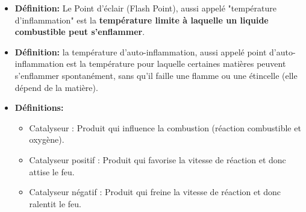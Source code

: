 \documentclass[a4paper]{article}
\begin{document}
\begin{itemize}
\item \textbf{Définition:} Le Point d’éclair (Flash Point), aussi appelé "température d’inflammation" est la \textbf{température limite à laquelle un liquide combustible peut s’enflammer}.





\item \textbf{Définition:} la température d’auto-inflammation, aussi appelé point d'auto-inflammation est la température pour laquelle certaines matières peuvent s’enflammer spontanément, sans qu’il faille une flamme ou une étincelle (elle dépend de la matière).





\item \textbf{Définitions:}
\begin{itemize}
    \item Catalyseur : Produit qui influence la combustion (réaction combustible et oxygène).
    \item Catalyseur positif : Produit qui favorise la vitesse de réaction et donc attise le feu.
    \item Catalyseur négatif : Produit qui freine la vitesse de réaction et donc ralentit le feu.
\end{itemize}






\end{itemize}
\end{document}
